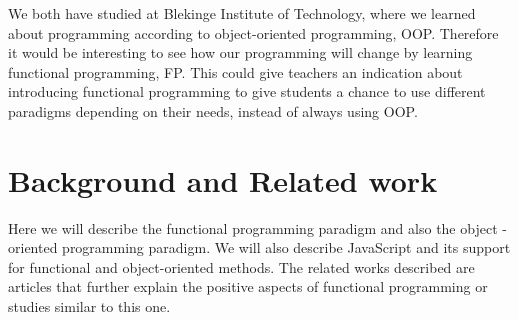 \documentclass {article}
\begin{document}
We both have studied at Blekinge Institute of Technology, where we learned about programming according to object-oriented programming, OOP. Therefore it would be interesting to see how our programming will change by learning functional programming, FP. This could give teachers an indication about introducing functional programming to give students a chance to use different paradigms depending on their needs, instead of always using OOP.
\section{Background and Related work}
Here we will describe the functional programming paradigm and also the object -oriented programming paradigm. We will also describe JavaScript and its support for functional and object-oriented methods. The related works described are articles that further explain the positive aspects of functional programming or studies similar to this one.
\end{document}
